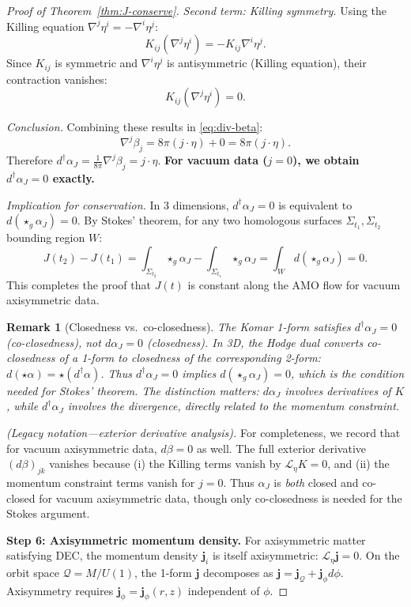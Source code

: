 \documentclass[10pt,a4paper]{amsart}
\newtheorem{remark}{Remark}
\newcommand{\momdens}{\boldsymbol{j}}
\begin{document}
\begin{proof}[Proof of Theorem~\ref{thm:J-conserve}]
\textit{Second term: Killing symmetry.} Using the Killing equation $\nabla^j \eta^i = -\nabla^i \eta^j$:
\[
K_{ij}(\nabla^j \eta^i) = -K_{ij}\nabla^i \eta^j.
\]
Since $K_{ij}$ is symmetric and $\nabla^i \eta^j$ is antisymmetric (Killing equation), their contraction vanishes:
\[
K_{ij}(\nabla^j \eta^i) = 0.
\]

\textit{Conclusion.} Combining these results in \eqref{eq:div-beta}:
\[
\nabla^j \beta_j = 8\pi(j \cdot \eta) + 0 = 8\pi(j \cdot \eta).
\]
Therefore $d^\dagger \alpha_J = \frac{1}{8\pi}\nabla^j \beta_j = j \cdot \eta$. \textbf{For vacuum data ($j = 0$), we obtain $d^\dagger \alpha_J = 0$ exactly.}

\textit{Implication for conservation.} In 3 dimensions, $d^\dagger \alpha_J = 0$ is equivalent to $d(\star_g \alpha_J) = 0$. By Stokes' theorem, for any two homologous surfaces $\Sigma_{t_1}, \Sigma_{t_2}$ bounding region $W$:
\[
J(t_2) - J(t_1) = \int_{\Sigma_{t_2}} \star_g \alpha_J - \int_{\Sigma_{t_1}} \star_g \alpha_J = \int_W d(\star_g \alpha_J) = 0.
\]
This completes the proof that $J(t)$ is constant along the AMO flow for vacuum axisymmetric data.

\begin{remark}[Closedness vs.~co-closedness]\label{rem:closed-vs-coclosed}
The Komar 1-form satisfies $d^\dagger \alpha_J = 0$ (co-closedness), not $d\alpha_J = 0$ (closedness). In 3D, the Hodge dual converts co-closedness of a 1-form to closedness of the corresponding 2-form: $d(\star \alpha) = \star(d^\dagger \alpha)$. Thus $d^\dagger \alpha_J = 0$ implies $d(\star_g \alpha_J) = 0$, which is the condition needed for Stokes' theorem. The distinction matters: $d\alpha_J$ involves derivatives of $K$, while $d^\dagger \alpha_J$ involves the divergence, directly related to the momentum constraint.
\end{remark}

\textit{(Legacy notation---exterior derivative analysis).} For completeness, we record that for vacuum axisymmetric data, $d\beta = 0$ as well. The full exterior derivative $(d\beta)_{jk}$ vanishes because (i) the Killing terms vanish by $\mathcal{L}_\eta K = 0$, and (ii) the momentum constraint terms vanish for $j = 0$. Thus $\alpha_J$ is \textit{both} closed and co-closed for vacuum axisymmetric data, though only co-closedness is needed for the Stokes argument.

\textbf{Step 6: Axisymmetric momentum density.}
For axisymmetric matter satisfying DEC, the momentum density $\momdens_i$ is itself axisymmetric: $\mathcal{L}_\eta \momdens = 0$. On the orbit space $\mathcal{Q} = M/U(1)$, the 1-form $\momdens$ decomposes as $\momdens = \momdens_{\mathcal{Q}} + \momdens_\phi d\phi$. Axisymmetry requires $\momdens_\phi = \momdens_\phi(r, z)$ independent of $\phi$.


\end{proof}
\end{document}
